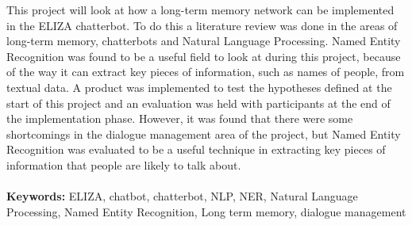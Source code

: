 %
%
\tocless{}

\vspace{6mm}
\begin{center}
    \begin{minipage}{13cm}
       This project will look at how a long-term memory network can be implemented in the ELIZA chatterbot. To do this a literature review was done in the areas of long-term memory, chatterbots and Natural Language Processing. Named Entity Recognition was found to be a useful field to look at during this project, because of the way it can extract key pieces of information, such as names of people, from textual data. A product was implemented to test the hypotheses defined at the start of this project and an evaluation was held with participants at the end of the implementation phase. However, it was found that there were some shortcomings in the dialogue management area of the project, but Named Entity Recognition was evaluated to be a useful technique in extracting key pieces of information that people are likely to talk about.\\\\
        \textbf{Keywords:} ELIZA, chatbot, chatterbot, NLP, NER, Natural Language Processing, Named Entity Recognition, Long term memory, dialogue management
    \end{minipage}\\
\end{center}

    